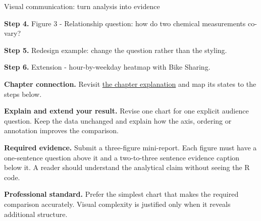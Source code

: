 \begin{labproject}{Visual communication: turn analysis into evidence}


\noindent\textbf{Step 4.} Figure 3 - Relationship question: how do two chemical measurements co-vary?


\noindent\textbf{Step 5.} Redesign example: change the question rather than the styling.


\noindent\textbf{Step 6.} Extension - hour-by-weekday heatmap with Bike Sharing.

\textbf{Chapter connection.} Revisit \hyperref[ch:visualization]{the chapter explanation} and map its states to the steps below.


\begin{verification}
\textbf{Explain and extend your result.} Revise one chart for one explicit audience question. Keep the data unchanged and explain how the axis, ordering or annotation improves the comparison.


\textbf{Required evidence.} Submit a three-figure mini-report. Each figure must have a one-sentence question above it and a two-to-three sentence evidence caption below it. A reader should understand the analytical claim without seeing the R code.

\textbf{Professional standard.} Prefer the simplest chart that makes the required comparison accurately. Visual complexity is justified only when it reveals additional structure.
\end{verification}
\end{labproject}
